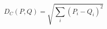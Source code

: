 \begin{equation}
    D_C(P, Q) = \sqrt{\sum_{i} (P_{i} - Q_{i})^2}
    \label{eq:cramer}
\end{equation}
